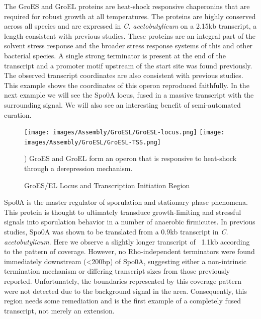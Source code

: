 The GroES and GroEL proteins are heat-shock responsive chaperonins that are required for robust growth at all temperatures. The proteins are highly conserved across all species and are expressed in \textit{C. acetobutylicum} on a 2.15kb transcript, a length consistent with previous studies. These proteins are an integral part of the solvent stress response and the broader stress response systems of this and other bacterial species. A single strong terminator is present at the end of the transcript and a promoter motif upstream of the start site was found previously. The observed transcript coordinates are also consistent with previous studies. This example shows the coordinates of this operon reproduced faithfully. In the next example we will see the Spo0A locus, fused in a massive transcript with the surrounding signal. We will also see an interesting benefit of semi-automated curation.
\begin{figure}
\small
{\texttt{[image: images/Assembly/GroESL/GroESL-locus.png]}
\label{fig:5a}}
{\texttt{[image: images/Assembly/GroESL/GroESL-TSS.png]}
\label{fig:5b}}
\caption{GroES/EL Locus and Transcription Initiation Region}
) GroES and GroEL form an operon that is responsive to heat-shock through a derepression mechanism.
\end{figure}

Spo0A is the master regulator of sporulation and stationary phase phenomena. This protein is thought to ultimately transduce growth-limiting and stressful signals into sporulation behavior in a number of anaerobic firmicutes. In previous studies, Spo0A was shown to be translated from a 0.9kb transcript in \textit{C. acetobutylicum}. Here we observe a slightly longer transcript of ~1.1kb according to the pattern of coverage. However, no Rho-independent terminators were found immediately downstream (\textless  200bp) of Spo0A, suggesting either a non-intrinsic termination mechanism or differing transcript sizes from those previously reported. Unfortunately, the boundaries represented by this coverage pattern were not detected due to the background signal in the area. Consequently, this region needs some remediation and is the first example of a completely fused transcript, not merely an extension.

